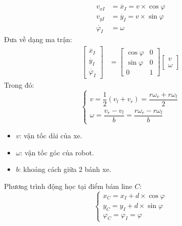           \begin{align*}
               v_{xI} &= \dot{x_I} = v \times \cos \varphi\\
               v_{yI} &= \dot{y_I} = v \times \sin \varphi\\
               \dot{\varphi_I} &= \omega
          \end{align*} 
          \hspace*{0.6cm}Đưa về dạng ma trận:
          \begin{align}
               \begin{bmatrix}
                    \dot{x_I} \\
                    \dot{y_I} \\
                    \dot{\varphi_I}
                    \end{bmatrix} &= \begin{bmatrix}
                    \cos\varphi & 0 \\
                    \sin\varphi & 0 \\
                    0 & 1
                    \end{bmatrix} \begin{bmatrix}
                    v \\
                    \omega
               \end{bmatrix}
               \label{c5_e1}
          \end{align}
          \hspace*{0.6cm}Trong đó:
          \begin{equation*}
               \begin{cases}
                    v = \dfrac{1}{2}(v_l + v_r) = \dfrac{r\omega_r + r\omega_l}{2} \\[0.5em]
                    \omega = \dfrac{v_r - v_l}{b} = \dfrac{r\omega_r - r\omega_l}{b}
               \end{cases}               
          \end{equation*}
          \begin{itemize}
               \item $v$: vận tốc dài của xe.
               \item $\omega$: vận tốc góc của robot.
               \item $b$: khoảng cách giữa 2 bánh xe.
          \end{itemize}
          \hspace*{0.6cm}Phương trình động học tại điểm bám line $C$:
          \begin{equation}
               \begin{cases}
                    x_C = x_I + d \times \cos \varphi \\[0.5em]
                    y_C = y_I + d \times \sin \varphi \\[0.5em]
                    \varphi_C = \varphi_I = \varphi
               \end{cases}   
               \label{c5_e2}            
          \end{equation}
